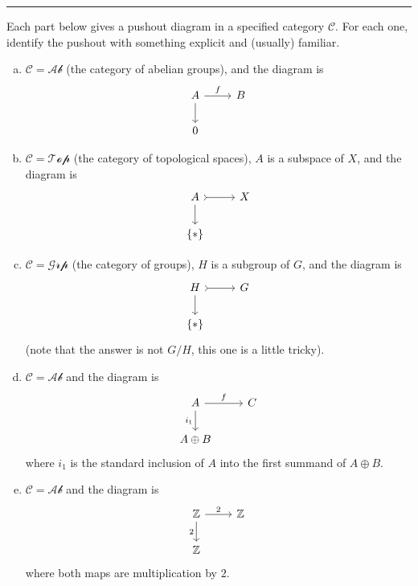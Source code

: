 \documentclass[a4paper, 12pt]{article}
\begin{document}
\noindent\rule{7in}{2.8pt}
\begin{problem}
Each part below gives a pushout diagram in a specified category \(\mathcal{C}\). For each one, identify the pushout with something explicit and (usually) familiar. 
\begin{enumerate}[(a)]
\item \(\mathcal{C}=\mathcal{Ab}\) (the category of abelian groups), and the diagram is 
\[\begin{tikzcd}
	A & B \\
	0
	\arrow["f", from=1-1, to=1-2]
	\arrow[from=1-1, to=2-1]
\end{tikzcd}\]
\item \(\mathcal{C}=\mathcal{Top}\) (the category of topological spaces), \(A\) is a subspace of \(X\), and the diagram is 
\[\begin{tikzcd}
	A & X \\
	{\left\{*\right\}}
	\arrow[tail, from=1-1, to=1-2]
	\arrow[from=1-1, to=2-1]
\end{tikzcd}\]
\item \(\mathcal{C}=\mathcal{Grp}\) (the category of groups), \(H\) is a subgroup of \(G\), and the diagram is 
\[\begin{tikzcd}
	H & G \\
	{\left\{*\right\}}
	\arrow[tail, from=1-1, to=1-2]
	\arrow[from=1-1, to=2-1]
\end{tikzcd}\]
(note that the answer is not \(G/H\), this one is a little tricky).
\item \(\mathcal{C}=\mathcal{Ab}\) and the diagram is 
\[\begin{tikzcd}
	A & C \\
	{A\oplus B}
	\arrow["f", from=1-1, to=1-2]
	\arrow["{i_1}"', from=1-1, to=2-1]
\end{tikzcd}\]
where \(i_1\) is the standard inclusion of \(A\) into the first summand of \(A\oplus B\).
\item \(\mathcal{C}=\mathcal{Ab}\) and the diagram is 
\[\begin{tikzcd}
	{\mathbb{Z}} & {\mathbb{Z}} \\
	{\mathbb{Z}}
	\arrow["2", from=1-1, to=1-2]
	\arrow["2"', from=1-1, to=2-1]
\end{tikzcd}\]
where both maps are multiplication by \(2\).

\end{enumerate}
\end{problem}
\end{document}
